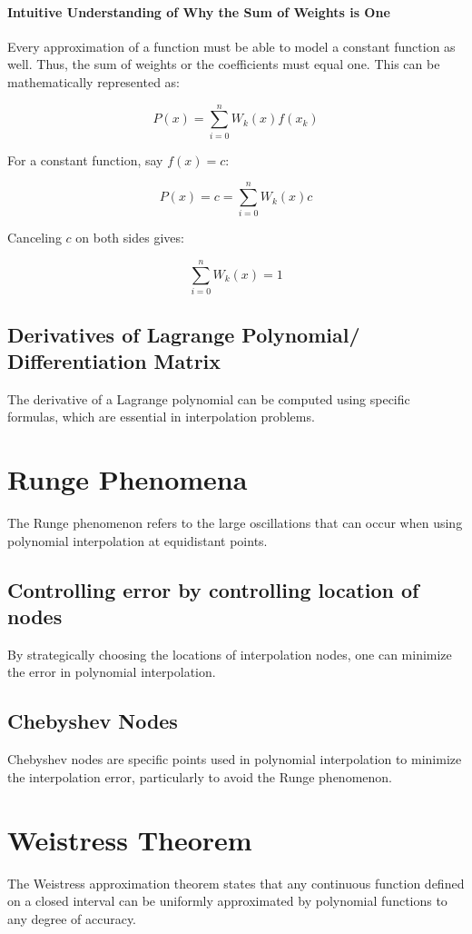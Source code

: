 \documentclass[12pt]{report} %
\begin{document}
\subsubsection{Intuitive Understanding of Why the Sum of Weights is One}
Every approximation of a function must be able to model a constant function as well. Thus, the sum of weights or the coefficients must equal one. This can be mathematically represented as:

\[
P(x) = \sum_{i=0}^{n} W_k(x) f(x_k)
\]

For a constant function, say \( f(x) = c \):

\[
P(x) = c = \sum_{i=0}^{n} W_k(x) c
\]

Canceling \( c \) on both sides gives:

\[
\sum_{i=0}^{n} W_k(x) = 1
\]


\section{Derivatives of Lagrange Polynomial/ Differentiation Matrix}
The derivative of a Lagrange polynomial can be computed using specific formulas, which are essential in interpolation problems.


\chapter{Runge Phenomena}
The Runge phenomenon refers to the large oscillations that can occur when using polynomial interpolation at equidistant points.

\section{Controlling error by controlling location of nodes}
By strategically choosing the locations of interpolation nodes, one can minimize the error in polynomial interpolation.

\section{Chebyshev Nodes}
Chebyshev nodes are specific points used in polynomial interpolation to minimize the interpolation error, particularly to avoid the Runge phenomenon.

\chapter{Weistress Theorem}
The Weistress approximation theorem states that any continuous function defined on a closed interval can be uniformly approximated by polynomial functions to any degree of accuracy.
\end{document}
